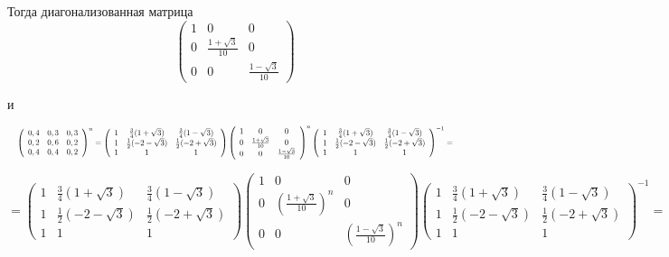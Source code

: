 \documentclass[a4paper,12pt]{article} %
\begin{document}
\begin{example}
Тогда диагонализованная матрица $$\left(\begin{array}{ccc}1 & 0 & 0 \\ 0 & \frac{1+\sqrt{3}}{10} & 0 \\ 0 & 0 & \frac{1-\sqrt{3}}{10}\end{array}\right)$$

и

$$
  \resizebox{\hsize}{!}{%
	$
	\left(\begin{array}{ccc}0,4 & 0,3 & 0,3 \\ 0,2 & 0,6 & 0,2 \\ 0,4 & 0,4 & 0,2\end{array}\right)^{n}
=
\left(\begin{array}{ccc}
	1 & \frac{3}{4}(1+\sqrt{3}) & \frac{3}{4}(1-\sqrt{3}) \\ 
	1 & \frac{1}{2}(-2-\sqrt{3}) & \frac{1}{2}(-2+\sqrt{3}) \\ 
	1 & 1 & 1
\end{array}\right)
\left(\begin{array}{ccc}
	1 & 0 & 0 \\ 
	0 & \frac{1+\sqrt{3}}{10} & 0 \\ 
	0 & 0 & 
	\frac{1-\sqrt{3}}{10}
\end{array}\right)^{n}
\left(\begin{array}{ccc}
1 & \frac{3}{4}(1+\sqrt{3}) & \frac{3}{4}(1-\sqrt{3}) \\ 
1 & \frac{1}{2}(-2-\sqrt{3}) & \frac{1}{2}(-2+\sqrt{3}) \\ 
1 & 1 & 1
\end{array}\right)^{-1}=
$}
$$



\[ 
=\left(\begin{array}{ccc}
1 & \frac{3}{4}(1+\sqrt{3}) & \frac{3}{4}(1-\sqrt{3}) \\
1 & \frac{1}{2}(-2-\sqrt{3}) & \frac{1}{2}(-2+\sqrt{3}) \\
1 & 1 & 1
\end{array}\right)
\left(\begin{array}{ccc}
1 & 0 & 0 \\
0 & \left(\frac{1+\sqrt{3}}{10}\right)^{n} & 0 \\
0 & 0 & \left(\frac{1-\sqrt{3}}{10}\right)^n
\end{array}\right)
\left(\begin{array}{ccc}
1 & \frac{3}{4}(1+\sqrt{3}) & \frac{3}{4}(1-\sqrt{3}) \\
1 & \frac{1}{2}(-2-\sqrt{3}) & \frac{1}{2}(-2+\sqrt{3}) \\
1 & 1 & 1
\end{array}\right)^{-1}= 
\]




\end{example}
\end{document}
